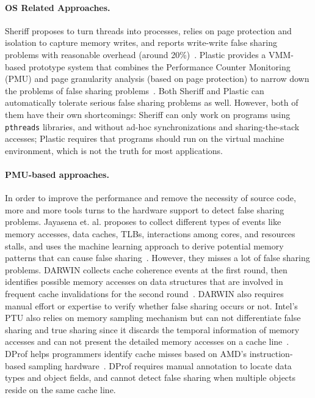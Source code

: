 \paragraph{OS Related Approaches.} Sheriff proposes to turn threads into processes, relies on page protection and isolation to capture memory writes, and reports write-write false sharing problems with reasonable overhead (around 20\%)~\cite{Sheriff}. Plastic provides a VMM-based prototype system that combines the Performance Counter Monitoring (PMU) and page granularity analysis (based on page protection) to narrow down the problems of false sharing problems~\cite{OSdetection}. Both Sheriff and Plastic can automatically tolerate serious false sharing problems as well. However, both of them have their own shortcomings: Sheriff can only work on programs using \texttt{pthreads} libraries, and without ad-hoc synchronizations and sharing-the-stack accesses; Plastic requires that programs should run on the virtual machine environment, which is not the truth for most applications.   

\paragraph{PMU-based approaches.} In order to improve the performance and remove the necessity of source code, more and more tools turns to the hardware support to detect false sharing problems. Jayasena et. al. proposes to collect different types of events like memory accesses, data caches, TLBs, interactions among cores, and resources stalls, and uses the machine learning approach to derive potential memory patterns that can cause false sharing~\cite{mldetect}. However, they misses a lot of false sharing problems. DARWIN collects cache coherence events at the first round, then identifies possible memory accesses on data structures that are involved in frequent cache invalidations for the second round~\cite{openmp}. DARWIN also requires manual effort or expertise to verify whether false sharing occurs or not. Intel's PTU also relies on memory sampling mechanism but can not differentiate false sharing and true sharing since it discards the temporal information of memory accesses and can not present the detailed memory accesses on a cache line~\cite{detect:ptu}. DProf helps programmers identify cache misses based on AMD's instruction-based sampling hardware~\cite{DProf}. DProf requires manual annotation to locate data types and object fields, and cannot detect false sharing when multiple objects reside on the same cache line. \\

